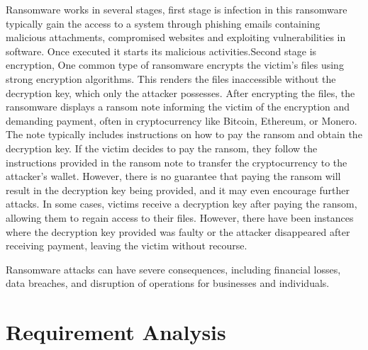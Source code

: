 \documentclass[12pt,twocolumn]{article}
\begin{document}
    Ransomware works in several stages, first stage is infection in this ransomware typically gain the access to a system through phishing emails containing malicious attachments, compromised websites and exploiting vulnerabilities in software. Once executed it starts its malicious activities.Second stage is encryption, One common type of ransomware encrypts the victim's files using strong encryption algorithms. This renders the files inaccessible without the decryption key, which only the attacker possesses. After encrypting the files, the ransomware displays a ransom note informing the victim of the encryption and demanding payment, often in cryptocurrency like Bitcoin, Ethereum, or Monero. The note typically includes instructions on how to pay the ransom and obtain the decryption key. If the victim decides to pay the ransom, they follow the instructions provided in the ransom note to transfer the cryptocurrency to the attacker's wallet. However, there is no guarantee that paying the ransom will result in the decryption key being provided, and it may even encourage further attacks. In some cases, victims receive a decryption key after paying the ransom, allowing them to regain access to their files. However, there have been instances where the decryption key provided was faulty or the attacker disappeared after receiving payment, leaving the victim without recourse.
    
    Ransomware attacks can have severe consequences, including financial losses, data breaches, and disruption of operations for businesses and individuals.

\section{Requirement Analysis}
\end{document}
